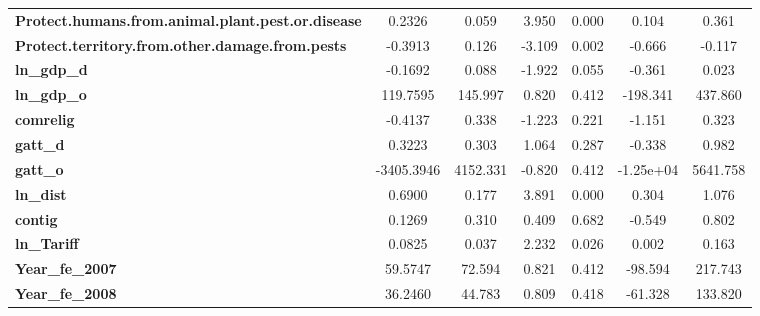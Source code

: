 \begin{center}
\begin{tabular}{lcccccc}
\textbf{Protect.humans.from.animal.plant.pest.or.disease}          &       0.2326  &        0.059     &     3.950  &         0.000        &        0.104    &        0.361     \\
\textbf{Protect.territory.from.other.damage.from.pests}            &      -0.3913  &        0.126     &    -3.109  &         0.002        &       -0.666    &       -0.117     \\
\textbf{ln\_gdp\_d}                                                &      -0.1692  &        0.088     &    -1.922  &         0.055        &       -0.361    &        0.023     \\
\textbf{ln\_gdp\_o}                                                &     119.7595  &      145.997     &     0.820  &         0.412        &     -198.341    &      437.860     \\
\textbf{comrelig}                                                  &      -0.4137  &        0.338     &    -1.223  &         0.221        &       -1.151    &        0.323     \\
\textbf{gatt\_d}                                                   &       0.3223  &        0.303     &     1.064  &         0.287        &       -0.338    &        0.982     \\
\textbf{gatt\_o}                                                   &   -3405.3946  &     4152.331     &    -0.820  &         0.412        &    -1.25e+04    &     5641.758     \\
\textbf{ln\_dist}                                                  &       0.6900  &        0.177     &     3.891  &         0.000        &        0.304    &        1.076     \\
\textbf{contig}                                                    &       0.1269  &        0.310     &     0.409  &         0.682        &       -0.549    &        0.802     \\
\textbf{ln\_Tariff}                                                &       0.0825  &        0.037     &     2.232  &         0.026        &        0.002    &        0.163     \\
\textbf{Year\_fe\_2007}                                            &      59.5747  &       72.594     &     0.821  &         0.412        &      -98.594    &      217.743     \\
\textbf{Year\_fe\_2008}                                            &      36.2460  &       44.783     &     0.809  &         0.418        &      -61.328    &      133.820     \\

\end{tabular}
\end{center}
